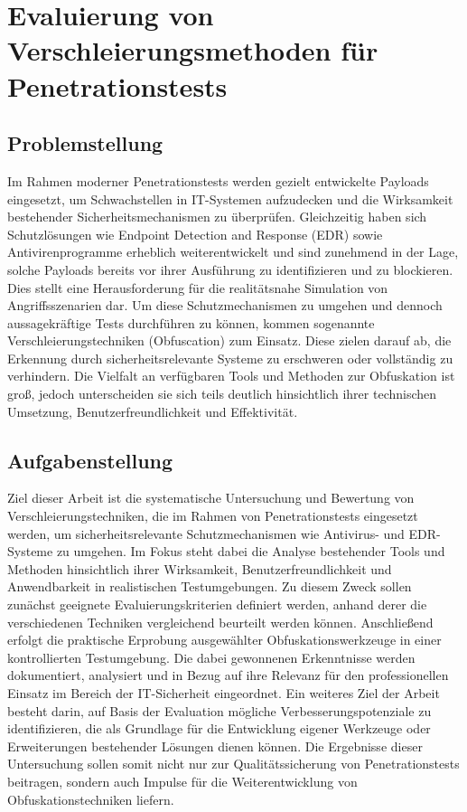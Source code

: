 \section{Evaluierung von Verschleierungsmethoden für Penetrationstests}
\subsection{Problemstellung}
    Im Rahmen moderner Penetrationstests werden gezielt entwickelte Payloads eingesetzt, um Schwachstellen in IT-Systemen aufzudecken und die Wirksamkeit bestehender Sicherheitsmechanismen zu überprüfen. Gleichzeitig haben sich Schutzlösungen wie Endpoint Detection and Response (EDR) sowie Antivirenprogramme erheblich weiterentwickelt und sind zunehmend in der Lage, solche Payloads bereits vor ihrer Ausführung zu identifizieren und zu blockieren. Dies stellt eine Herausforderung für die realitätsnahe Simulation von Angriffsszenarien dar.\newline
    Um diese Schutzmechanismen zu umgehen und dennoch aussagekräftige Tests durchführen zu können, kommen sogenannte Verschleierungstechniken (Obfuscation) zum Einsatz. Diese zielen darauf ab, die Erkennung durch sicherheitsrelevante Systeme zu erschweren oder vollständig zu verhindern. Die Vielfalt an verfügbaren Tools und Methoden zur Obfuskation ist groß, jedoch unterscheiden sie sich teils deutlich hinsichtlich ihrer technischen Umsetzung, Benutzerfreundlichkeit und Effektivität.\newline
\subsection{Aufgabenstellung}
    Ziel dieser Arbeit ist die systematische Untersuchung und Bewertung von Verschleierungstechniken, die im Rahmen von Penetrationstests eingesetzt werden, um sicherheitsrelevante Schutzmechanismen wie Antivirus- und EDR-Systeme zu umgehen. Im Fokus steht dabei die Analyse bestehender Tools und Methoden hinsichtlich ihrer Wirksamkeit, Benutzerfreundlichkeit und Anwendbarkeit in realistischen Testumgebungen.\newline
    Zu diesem Zweck sollen zunächst geeignete Evaluierungskriterien definiert werden, anhand derer die verschiedenen Techniken vergleichend beurteilt werden können. Anschließend erfolgt die praktische Erprobung ausgewählter Obfuskationswerkzeuge in einer kontrollierten Testumgebung. Die dabei gewonnenen Erkenntnisse werden dokumentiert, analysiert und in Bezug auf ihre Relevanz für den professionellen Einsatz im Bereich der IT-Sicherheit eingeordnet.\newline
    Ein weiteres Ziel der Arbeit besteht darin, auf Basis der Evaluation mögliche Verbesserungspotenziale zu identifizieren, die als Grundlage für die Entwicklung eigener Werkzeuge oder Erweiterungen bestehender Lösungen dienen können. Die Ergebnisse dieser Untersuchung sollen somit nicht nur zur Qualitätssicherung von Penetrationstests beitragen, sondern auch Impulse für die Weiterentwicklung von Obfuskationstechniken liefern.
